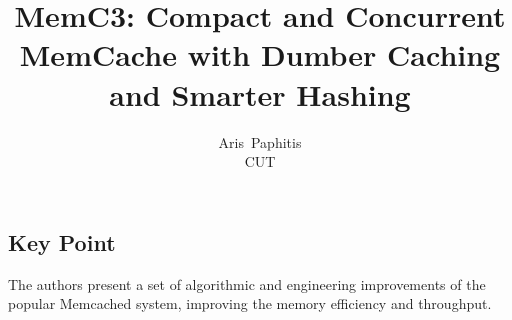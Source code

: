 \documentclass[letterpaper,twocolumn,10pt]{article}
\begin{document}
\date{}

\title{\Large \bf MemC3: Compact and Concurrent MemCache with Dumber Caching and Smarter Hashing}

\author{
{\rm Aris\ Paphitis}\\
CUT
} %

\maketitle

\thispagestyle{empty}


\subsection*{Key Point}
The authors present a set of algorithmic and engineering improvements of the popular Memcached system, improving the memory efficiency and throughput.
\end{document}
